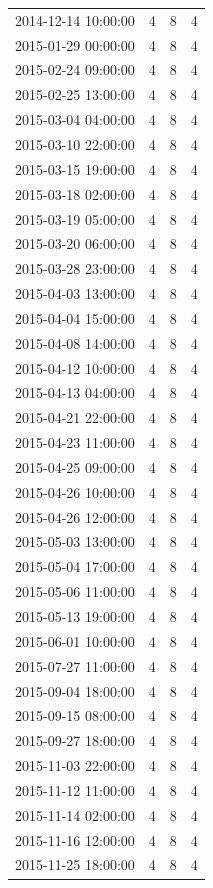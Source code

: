\begin{tabular}{lrrr}
2014-12-14 10:00:00 & 4 & 8 & 4 \\
2015-01-29 00:00:00 & 4 & 8 & 4 \\
2015-02-24 09:00:00 & 4 & 8 & 4 \\
2015-02-25 13:00:00 & 4 & 8 & 4 \\
2015-03-04 04:00:00 & 4 & 8 & 4 \\
2015-03-10 22:00:00 & 4 & 8 & 4 \\
2015-03-15 19:00:00 & 4 & 8 & 4 \\
2015-03-18 02:00:00 & 4 & 8 & 4 \\
2015-03-19 05:00:00 & 4 & 8 & 4 \\
2015-03-20 06:00:00 & 4 & 8 & 4 \\
2015-03-28 23:00:00 & 4 & 8 & 4 \\
2015-04-03 13:00:00 & 4 & 8 & 4 \\
2015-04-04 15:00:00 & 4 & 8 & 4 \\
2015-04-08 14:00:00 & 4 & 8 & 4 \\
2015-04-12 10:00:00 & 4 & 8 & 4 \\
2015-04-13 04:00:00 & 4 & 8 & 4 \\
2015-04-21 22:00:00 & 4 & 8 & 4 \\
2015-04-23 11:00:00 & 4 & 8 & 4 \\
2015-04-25 09:00:00 & 4 & 8 & 4 \\
2015-04-26 10:00:00 & 4 & 8 & 4 \\
2015-04-26 12:00:00 & 4 & 8 & 4 \\
2015-05-03 13:00:00 & 4 & 8 & 4 \\
2015-05-04 17:00:00 & 4 & 8 & 4 \\
2015-05-06 11:00:00 & 4 & 8 & 4 \\
2015-05-13 19:00:00 & 4 & 8 & 4 \\
2015-06-01 10:00:00 & 4 & 8 & 4 \\
2015-07-27 11:00:00 & 4 & 8 & 4 \\
2015-09-04 18:00:00 & 4 & 8 & 4 \\
2015-09-15 08:00:00 & 4 & 8 & 4 \\
2015-09-27 18:00:00 & 4 & 8 & 4 \\
2015-11-03 22:00:00 & 4 & 8 & 4 \\
2015-11-12 11:00:00 & 4 & 8 & 4 \\
2015-11-14 02:00:00 & 4 & 8 & 4 \\
2015-11-16 12:00:00 & 4 & 8 & 4 \\
2015-11-25 18:00:00 & 4 & 8 & 4 \\

\end{tabular}
